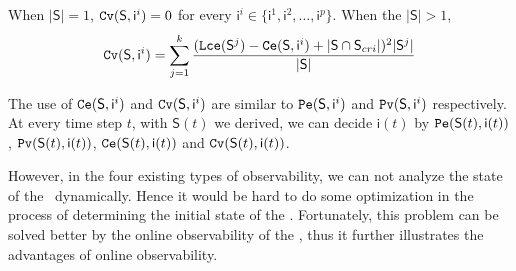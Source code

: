 \begin{definition} 
When $|\mathsf{S}|=1$, 
${\tt Cv}(\mathsf{S}, \mathsf{ i}^{i})=0$ for every  $\mathsf{ i}^{i} \in \{\mathsf{ i}^{1},\mathsf{ i}^{2},\ldots, \mathsf{ i}^{p}\}$.  When the $|\mathsf{S}|>1$, 
\begin{equation}
\begin{split}
{\tt Cv}(\mathsf{S}, \mathsf{ i}^{i})=\sum_{j=1}^k\frac{ ({\tt Lce}(\mathsf{S}^{j})-{\tt Ce}(\mathsf{S}, \mathsf{ i}^{i})+|\mathsf{S} \cap \mathsf{S}_{cri}|)^2 |\mathsf{S}^{j}|}{ |\mathsf{S}|}
\end{split}
\end{equation}
\end{definition}

The use of ${\tt Ce}(\mathsf{S}, \mathsf{ i}^{i})$ and ${\tt Cv}(\mathsf{S}, \mathsf{ i}^{i})$ are similar to ${\tt Pe}(\mathsf{S}, \mathsf{ i}^{i})$ and ${\tt Pv}(\mathsf{S}, \mathsf{ i}^{i})$ respectively. At every time step $t$, with $\mathsf{S}(t)$ we derived, we can decide $\mathsf{i}(t)$ by $ {\tt Pe}(\mathsf{S}(t), \mathsf{ i}(t))$, ${\tt Pv}(\mathsf{S}(t), \mathsf{ i}(t))$, ${\tt Ce}(\mathsf{S}(t), \mathsf{ i}(t))$ and ${\tt Cv}(\mathsf{S}(t), \mathsf{ i}(t))$.

However, in the four existing types of observability, we can not analyze the state of the \BCNs\ dynamically. Hence it would be hard to do some optimization in the process of determining the initial state of the \BCNs. Fortunately, this problem can be solved better by the online observability of the \BCNs, thus it further illustrates the advantages of online observability.